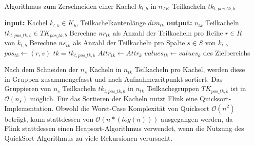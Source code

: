 \begin{algorithm}[H]
\small
\caption{Algorithmus zum Zerschneiden einer Kachel $k_{t, b}$ in $n_{TK}$ Teilkacheln $tk_{t, pos\_tk, b}$}
\label{alg:cutAlgorithm}
\begin{algorithmic}[1]
	\State \textbf{input:} Kachel $k_{t, b} \in K_{b}$, Teilkachelkantenlänge $dim_{tk}$ 
	\State \textbf{output:} $n_{tk}$ Teilkacheln $tk_{t, pos\_tk, b} \in TK_{pos\_tk, b}$
	\State Berechne $nr_{tk}$ als Anzahl der Teilkacheln pro Reihe $r \in R$ von $k_{t, b}$  \label{alg:calcNR}
	\State Berechne $ns_{tk}$ als Anzahl der Teilkacheln pro Spalte $s \in S$ von $k_{t, b}$  \label{alg:calcNS}
	  \label{alg:iterR}
        		  \label{alg:iterS}
			\State $pos_{tk} \leftarrow (r, s)$  \label{alg:setAttributes}
			\State $tk = tk_{t, pos\_tk, b}$ 
        			\State $Attr_{tk} \leftarrow Attr_{k}$ 
			   \label{alg:computeS16}
				\State $values_{tk} \leftarrow values_k$ des Zielbereichs 
			\EndFor
		\EndFor
		 
	\EndFor
\EndFunction
\end{algorithmic}
\end{algorithm}

Nach dem Schneiden der $n_s$ Kacheln in $n_{tk}$ Teilkacheln pro Kachel, werden diese in Gruppen zusammengefasst und nach Aufnahmezeitpunkt sortiert. Das Gruppieren von $n_{s}$ Teilkacheln $tk_{t, pos\_tk, b}$ in $n_{tk}$ Teilkachegruppen $TK_{pos\_tk, b}$ ist in $\mathcal{O}(n_{s})$ möglich. Für das Sortieren der Kacheln nutzt Flink eine Quicksort-Implementation. Obwohl die Worst-Case Komplexität von Quicksort $\mathcal{O}(n^2)$ beträgt, kann stattdessen von $\mathcal{O}(n*(log(n)))$ ausgegangen werden, da Flink stattdessen einen Heapsort-Algorithmus verwendet, wenn die Nutzung des QuickSort-Algorithmus zu viele Rekursionen verursacht. 

